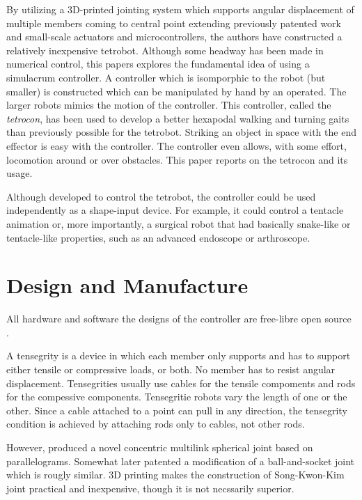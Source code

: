 \documentclass[conference]{IEEEtran}
\begin{document}
By utilizing a 3D-printed jointing system
 which
 supports angular displacement of multiple members coming to central point
 extending previously patented work \citet{song2003spherical} and small-scale
 actuators and microcontrollers, the authors have constructed a relatively
 inexpensive tetrobot. Although some headway has been made in numerical
 control, this papers explores the fundamental idea of using a simulacrum
 controller. A controller which is isomporphic to the robot (but smaller)
 is constructed
 which can be manipulated by hand by an operated. The larger robots mimics
 the motion of the controller. This controller, called the {\em tetrocon},
 has been used to develop a better hexapodal walking and turning gaits
 than previously possible for the tetrobot. Striking an object in space
 with the end effector is easy with the controller. The controller even allows, with some effort,
 locomotion around or over obstacles.  This paper reports on the tetrocon
 and its usage.

 Although developed to control the tetrobot, the controller could be used
 independently as a shape-input device. For example, it could control
 a tentacle animation or, more importantly, a surgical robot that had
 basically snake-like or
 tentacle-like properties, such as an advanced endoscope or arthroscope.

 \section{Design and Manufacture}

 All hardware and software the designs of the controller are free-libre
 open source \citet{anonymous}.

 A tensegrity is a device in which each member only supports and has to
 support either tensile or compressive loads, or both.
 No member has to resist angular displacement.
 Tensegrities usually use cables for the tensile compoments and rods
 for the compessive components. Tensegritie robots vary the length of one or
 the other.
 Since a cable attached to a point can pull in any direction, the tensegrity
 condition is achieved by attaching rods only to cables, not other rods.

 However, \citet{HamlinSandersonCMS} produced a novel concentric
 multilink spherical joint based on parallelograms. Somewhat later
 \citet{song2003spherical} patented a modification of a ball-and-socket
 joint which is rougly similar. 3D printing makes the construction of
 Song-Kwon-Kim joint practical and inexpensive, though it is not necssarily
 superior.
\end{document}
